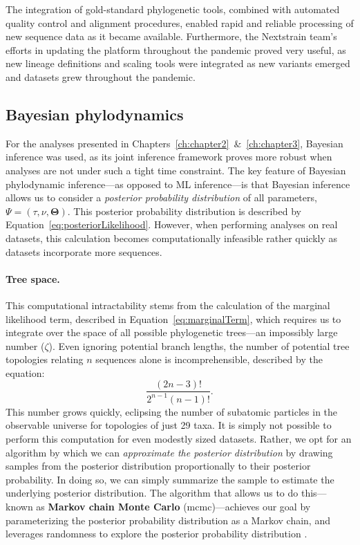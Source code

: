 The integration of gold-standard phylogenetic tools, combined with automated quality control and alignment procedures, enabled rapid and reliable processing of new sequence data as it became available.
Furthermore, the Nextstrain team's efforts in updating the platform throughout the pandemic proved very useful, as new lineage definitions and scaling tools were integrated as new variants emerged and datasets grew throughout the pandemic.

\subsection{Bayesian phylodynamics}
For the analyses presented in Chapters~\ref{ch:chapter2}~\&~\ref{ch:chapter3}, Bayesian inference was used, as its joint inference framework proves more robust when analyses are not under such a tight time constraint.
The key feature of Bayesian phylodynamic inference---as opposed to ML inference---is that Bayesian inference allows us to consider a \textit{posterior probability distribution} of all parameters, $\Psi = (\tau,\nu,\mathbf{\Theta})$.
This posterior probability distribution is described by Equation~\ref{eq:posteriorLikelihood}.
However, when performing analyses on real datasets, this calculation becomes computationally infeasible rather quickly as datasets incorporate more sequences.

\paragraph*{Tree space.}
This computational intractability stems from the calculation of the marginal likelihood term, described in Equation~\ref{eq:marginalTerm}, which requires us to integrate over the space of all possible phylogenetic trees---an impossibly large number ($\zeta$).
Even ignoring potential branch lengths, the number of potential tree topologies relating $n$ sequences alone is incomprehensible, described by the equation:
\begin{equation}
  \label{eq:treeSpace}
  \frac{(2n-3)!}{2^{n-1}(n-1)!}.
\end{equation}
This number grows quickly, eclipsing the number of subatomic particles in the observable universe \citep{padilla2022fantastic} for topologies of just 29 taxa.
It is simply not possible to perform this computation for even modestly sized datasets.
Rather, we opt for an algorithm by which we can \textit{approximate the posterior distribution} by drawing samples from the posterior distribution proportionally to their posterior probability.
In doing so, we can simply summarize the sample to estimate the underlying posterior distribution.
The algorithm that allows us to do this---known as \textbf{Markov chain Monte Carlo} (\gls{mcmc})---achieves our goal by parameterizing the posterior probability distribution as a Markov chain, and leverages randomness to explore the posterior probability distribution \citep{geyer1992practical}.


